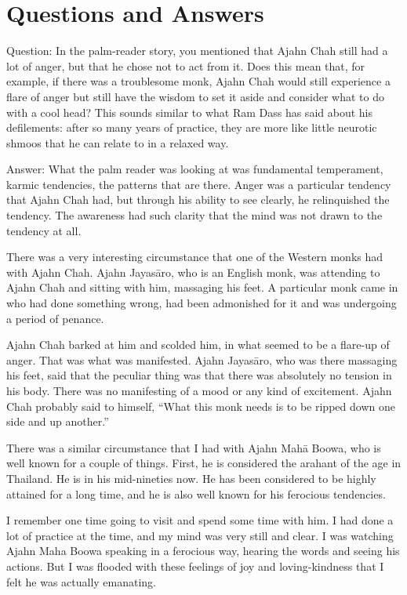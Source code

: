 \chapter{Questions and Answers}

\qaspace
Question: In the palm-reader story, you mentioned that Ajahn Chah still
had a lot of anger, but that he chose not to act from it. Does this mean
that, for example, if there was a troublesome monk, Ajahn Chah would
still experience a flare of anger but still have the wisdom to set it
aside and consider what to do with a cool head? This sounds similar to
what Ram Dass has said about his defilements: after so many years of
practice, they are more like little neurotic shmoos that he can relate
to in a relaxed way.

\qaspace
Answer: What the palm reader was looking at was fundamental temperament,
karmic tendencies, the patterns that are there. Anger was a particular
tendency that Ajahn Chah had, but through his ability to see clearly, he
relinquished the tendency. The awareness had such clarity that the mind
was not drawn to the tendency at all.

There was a very interesting circumstance that one of the Western monks
had with Ajahn Chah. Ajahn Jayasāro, who is an English monk, was
attending to Ajahn Chah and sitting with him, massaging his feet. A
particular monk came in who had done something wrong, had been
admonished for it and was undergoing a period of penance.

Ajahn Chah barked at him and scolded him, in what seemed to be a
flare-up of anger. That was what was manifested. Ajahn Jayasāro, who was
there massaging his feet, said that the peculiar thing was that there
was absolutely no tension in his body. There was no manifesting of a
mood or any kind of excitement. Ajahn Chah probably said to himself,
“What this monk needs is to be ripped down one side and up another.”

There was a similar circumstance that I had with Ajahn Mahā Boowa, who
is well known for a couple of things. First, he is considered the
arahant of the age in Thailand. He is in his mid-nineties now. He has
been considered to be highly attained for a long time, and he is also
well known for his ferocious tendencies.

I remember one time going to visit and spend some time with him. I had
done a lot of practice at the time, and my mind was very still and
clear. I was watching Ajahn Maha Boowa speaking in a ferocious way,
hearing the words and seeing his actions. But I was flooded with these
feelings of joy and loving-kindness that I felt he was actually
emanating.

